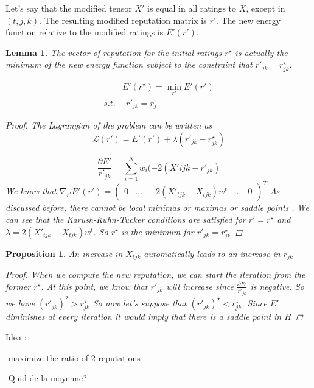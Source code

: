 \documentclass[12pt,a4paper]{article}
\newtheorem{lemma}{Lemma}
\newtheorem{proposition}{Proposition}
\begin{document}
Let's say that the modified tensor $X'$ is equal in all ratings to $X$, except in $(t,j,k)$. The resulting modified reputation matrix is $r'$. The new energy function relative to the modified ratings is $E'(r')$.
\begin{lemma}
The vector of reputation for the initial ratings $r^{\star}$ is actually the minimum of the new energy function subject to the constraint that $r'_{jk}=r^{\star}_{jk}$.

\begin{align*} 
 & E'(r^{\star}) = \min_{r'} E'(r')\\
s.t.  & \:\: r'_{jk} = r_j
\end{align*}

\begin{proof}
The Lagrangian of the problem can be written as
$$\mathcal{L}(r') = E'(r') + \lambda (r'_{jk} - r_{jk}^{\star})$$

$$\frac{\partial E'}{r'_{jk}} = \sum_{i=1}^N w_i (-2 (X'{ijk}-r'_{jk})$$
We know that $\nabla_{r'}E'(r') = \begin{pmatrix} 0 & \hdots & -2 (X'_{tjk}-X_{tjk})w^t & \hdots & 0\end{pmatrix}^T$
As discussed before, there cannot be local minimas or maximas or saddle points .
We can see that the Karush-Kuhn-Tucker conditions are satisfied for $r' = r^{\star}$ and $\lambda = 2 (X'_{tjk}-X_{tjk})w^t$. So $r^{\star}$ is the minimum for $r'_{jk} = r^{\star}_{jk}$
\end{proof}
\end{lemma}


\begin{proposition}
An increase in $X_{tjk}$ automatically leads to an increase in $r_{jk}$
\begin{proof}
When we compute the new reputation, we can start the iteration from the former $r^{\star}$. At this point, we know that $r'_{jk}$ will increase since $\frac{\partial E'}{r'_{jk}} $ is negative. So we have $(r'_{jk})^2 > r^{\star}_{jk}$
So now let's suppose that $(r'_{jk})^{\star}< r^{\star}_{jk} $. Since $E'$ diminishes at every iteration it would imply that there is a saddle point in $H$
\end{proof}

\end{proposition}
Idea : 

-maximize the ratio of 2 reputations

-Quid de la moyenne?


\nocite{*}
\end{document}
